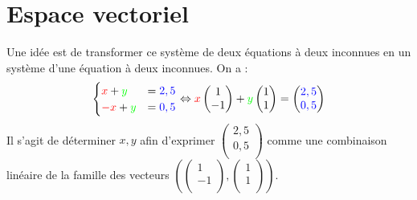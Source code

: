 \documentclass{book}
\begin{document}
\section{Espace vectoriel}
Une idée est de transformer ce système de deux équations à deux inconnues en un système d'une équation à deux inconnues. On a :\\
$$\begin{cases}
{\color{red}x}+{\color{green}y}&={\color{blue}2,5}\\
{\color{red}-x}+{\color{green}y}&={\color{blue}0,5}
\end{cases}
\Leftrightarrow
	 {\color{red}x}\begin{pmatrix}
 1    \\
 -1   \\
\end{pmatrix}+{\color{green}y}\begin{pmatrix}
  1   \\
  1  \\
\end{pmatrix}=\begin{pmatrix}
 {\color{blue}2,5}   \\
 {\color{blue}0,5}  \\
\end{pmatrix}$$
Il s'agit de déterminer $x,y$ afin d'exprimer $\begin{pmatrix}
 2,5   \\
 0,5  \\
\end{pmatrix}$  comme une combinaison linéaire de la famille des vecteurs $(\begin{pmatrix}
 1    \\
 -1   \\
\end{pmatrix},\begin{pmatrix}
 1   \\
  1  \\
\end{pmatrix})$. 
\end{document}
